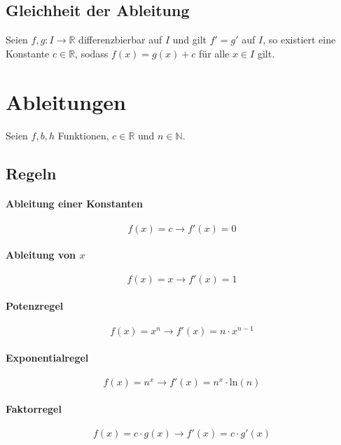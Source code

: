         \subsection{Gleichheit der Ableitung}
            Seien $ f, g : I \rightarrow \mathbb{R} $ differenzbierbar auf $ I $ und gilt $ f' = g' $ auf $ I $, so existiert eine Konstante $ c \in \mathbb{R} $, sodass $ f(x) = g(x) + c $ für alle $ x \in I $ gilt.

    \section{Ableitungen}
        Seien $ f, b, h $ Funktionen, $ c \in \mathbb{R} $ und $ n \in \mathbb{N} $.

        \subsection{Regeln}
            \paragraph{Ableitung einer Konstanten}
                \[ f(x) = c \rightarrow f'(x) = 0 \]

            \paragraph{Ableitung von $ x $}
                \[ f(x) = x \rightarrow f'(x) = 1 \]

            \paragraph{Potenzregel}
                \[ f(x) = x ^ n \rightarrow f'(x) = n \cdot x ^ { n - 1 } \]

            \paragraph{Exponentialregel}
                \[ f(x) = n ^ x \rightarrow f'(x) = n ^ x \cdot \text{ln}(n) \]

            \paragraph{Faktorregel}
                \[ f(x) = c \cdot g(x) \rightarrow f'(x) = c \cdot g'(x) \]

